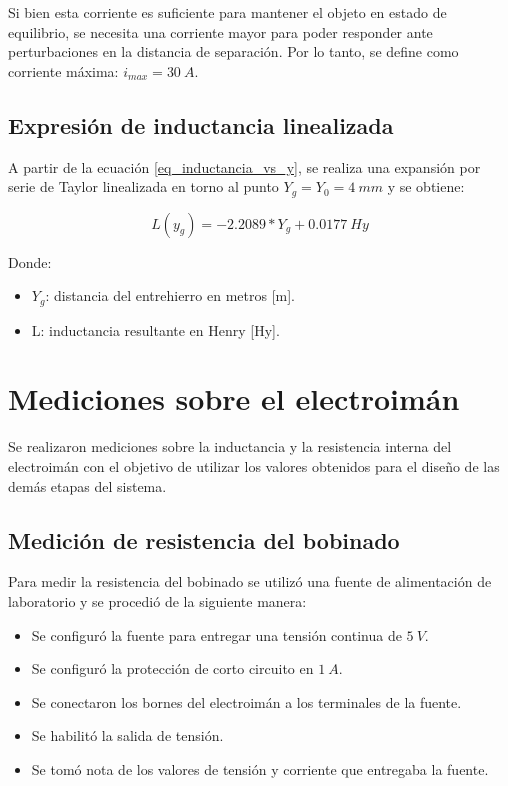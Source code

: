 \noindent Si bien esta corriente es suficiente para mantener el objeto en estado de equilibrio, se necesita una corriente mayor para poder responder ante perturbaciones en la distancia de separación. Por lo tanto, se define como corriente máxima: $i_{max}=30\:A$.


\subsection{Expresión de inductancia linealizada}
\label{secc_exp_ind_linealizada}
\noindent A partir de la ecuación \ref{eq_inductancia_vs_y}, se realiza una expansión por serie de Taylor linealizada en torno al punto $Y_{g}=Y_{0}=4\:mm$ y se obtiene:

\begin{equation} \label{eq_inductancia_lineal_teorica}
	L(y_{g})=-2.2089*Y_{g}+0.0177\:Hy
\end{equation}

\noindent Donde:
\begin{itemize}
	\item $Y_{g}$: distancia del entrehierro en metros [m].
	\item L: inductancia resultante en Henry [Hy].
\end{itemize}

\section{Mediciones sobre el electroimán}

\noindent Se realizaron mediciones sobre la inductancia y la resistencia interna del electroimán con el objetivo de utilizar los valores obtenidos para el diseño de las demás etapas del sistema.

\subsection{Medición de resistencia del bobinado}

\noindent Para medir la resistencia del bobinado se utilizó una fuente de alimentación de laboratorio y se procedió de la siguiente manera:

\begin{itemize}
	\item Se configuró la fuente para entregar una tensión continua de $5\:V$.
	\item Se configuró la protección de corto circuito en $1\:A$.
	\item Se conectaron los bornes del electroimán a los terminales de la fuente.
	\item Se habilitó la salida de tensión.
	\item Se tomó nota de los valores de tensión y corriente que entregaba la fuente.
\end{itemize}

